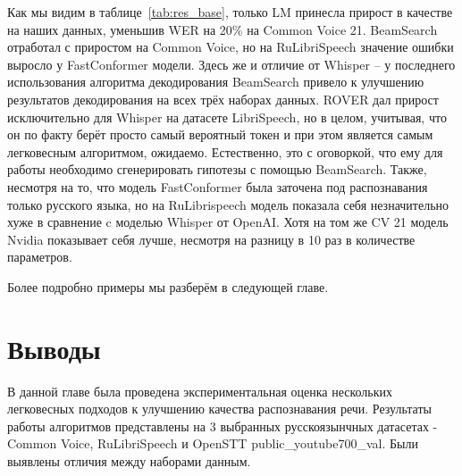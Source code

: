 Как мы видим в таблице~\ref{tab:res_base}, только LM принесла прирост в качестве на наших данных, уменьшив WER на 20\% на Common Voice 21.
BeamSearch отработал с приростом на Common Voice, но на RuLibriSpeech значение ошибки выросло у FastConformer модели.
Здесь же и отличие от Whisper -- у последнего использования алгоритма декодирования BeamSearch привело к улучшению результатов декодирования на всех трёх наборах данных.
ROVER дал прирост исключительно для Whisper на датасете LibriSpeech, но в целом, учитывая, что он по факту берёт просто самый вероятный токен и при этом является самым легковесным алгоритмом, ожидаемо.
Естественно, это с оговоркой, что ему для работы необходимо сгенерировать гипотезы с помощью BeamSearch.
Также, несмотря на то, что модель FastConformer была заточена под распознавания только русского языка, но на RuLibrispeech модель показала себя незначительно хуже в сравнение c моделью Whisper от OpenAI.
Хотя на том же CV 21 модель Nvidia показывает себя лучше, несмотря на разницу в 10 раз в количестве параметров.

Более подробно примеры мы разберём в следующей главе.

\section{Выводы}
В данной главе была проведена экспериментальная оценка нескольких легковесных подходов к улучшению качества распознавания речи.
Результаты работы алгоритмов представлены на 3 выбранных русскоязынчных датасетах - Common Voice, RuLibriSpeech и OpenSTT public\_youtube700\_val.
Были выявлены отличия между наборами данным.